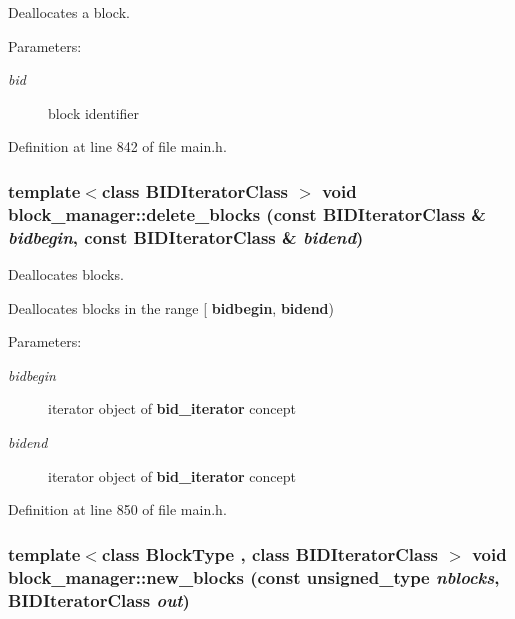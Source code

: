 Deallocates a block. 

\begin{Desc}
\item[Parameters:]
\begin{description}
\item[{\em bid}]block identifier \end{description}
\end{Desc}


Definition at line 842 of file main.h.\hypertarget{group__mnglayer_g0a41492a2faef107fb3c5a7c1ce5ee2d}{
\subsubsection[{delete\_\-blocks}]{\setlength{\rightskip}{0pt plus 5cm}template$<$class BIDIteratorClass $>$ void block\_\-manager::delete\_\-blocks (const BIDIteratorClass \& {\em bidbegin}, \/  const BIDIteratorClass \& {\em bidend})}}
\label{group__mnglayer_g0a41492a2faef107fb3c5a7c1ce5ee2d}


Deallocates blocks. 

Deallocates blocks in the range \mbox{[} {\bf bidbegin}, {\bf bidend}) \begin{Desc}
\item[Parameters:]
\begin{description}
\item[{\em bidbegin}]iterator object of {\bf bid\_\-iterator} concept \item[{\em bidend}]iterator object of {\bf bid\_\-iterator} concept \end{description}
\end{Desc}


Definition at line 850 of file main.h.\hypertarget{group__mnglayer_ge77531e60b365f05da213ba7d8b17c9a}{
\subsubsection[{new\_\-blocks}]{\setlength{\rightskip}{0pt plus 5cm}template$<$class BlockType , class BIDIteratorClass $>$ void block\_\-manager::new\_\-blocks (const unsigned\_\-type {\em nblocks}, \/  BIDIteratorClass {\em out})}}
\label{group__mnglayer_ge77531e60b365f05da213ba7d8b17c9a}


